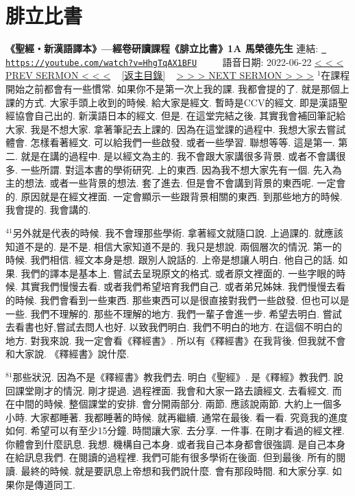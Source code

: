 \documentclass{book}
\begin{document}
\section{腓立比書}
\label{sec:HhgTqAX1BFU}
\textbf{《聖經‧新漢語譯本》—經卷研讀課程《腓立比書》1A 馬榮德先生}
\newline
\newline
連結: \href{https://youtube.com/watch?v=HhgTqAX1BFU}{\texttt{ https://youtube.com/watch?v=HhgTqAX1BFU}} ~~~~ 語音日期: 2022-06-22 
\newline
\newline
\hyperref[sec:code]{\small{< < < PREV SERMON < < <}}
~
\hyperref[sec:index]{\small{[返主目錄]}}
~
\hyperref[sec:io2zo_oCeFk]{\small{> > > NEXT SERMON > > >}}
\newline
\newline
$^{1}$在課程開始之前都會有一些慣常.
如果你不是第一次上我的課.
我都會提的了.
就是那個上課的方式.
大家手頭上收到的時候.
給大家是經文.
暫時是CCV的經文.
即是漢語聖經協會自己出的.
新漢語日本的經文.
但是.
在這堂完結之後.
其實我會補回筆記給大家.
我是不想大家.
拿著筆記去上課的.
因為在這堂課的過程中.
我想大家去嘗試體會.
怎樣看著經文.
可以給我們一些啟發.
或者一些學習.
聯想等等.
這是第一.
第二.
就是在講的過程中.
是以經文為主的.
我不會跟大家講很多背景.
或者不會講很多.
一些所謂.
對這本書的學術研究.
上的東西.
因為我不想大家先有一個.
先入為主的想法.
或者一些背景的想法.
套了進去.
但是會不會講到背景的東西呢.
一定會的.
原因就是在經文裡面.
一定會顯示一些跟背景相關的東西.
到那些地方的時候.
我會提的.
我會講的.

$^{41}$另外就是代表的時候.
我不會理那些學術.
拿著經文就隨口說.
上過課的.
就應該知道不是的.
是不是.
相信大家知道不是的.
我只是想說.
兩個層次的情況.
第一的時候.
我們相信.
經文本身是想.
跟別人說話的.
上帝是想讓人明白.
他自己的話.
如果.
我們的譯本是基本上.
嘗試去呈現原文的格式.
或者原文裡面的.
一些字眼的時候.
其實我們慢慢去看.
或者我們希望培育我們自己.
或者弟兄姊妹.
我們慢慢去看的時候.
我們會看到一些東西.
那些東西可以是很直接對我們一些啟發.
但也可以是一些.
我們不理解的.
那些不理解的地方.
我們一輩子會進一步.
希望去明白.
嘗試去看書也好,嘗試去問人也好.
以致我們明白.
我們不明白的地方.
在這個不明白的地方.
對我來說.
我一定會看《釋經書》.
所以有《釋經書》在我背後.
但我就不會和大家說.
《釋經書》說什麼.

$^{81}$那些狀況.
因為不是《釋經書》教我們去.
明白《聖經》.
是《釋經》教我們.
說回課堂剛才的情況.
剛才提過.
過程裡面.
我會和大家一路去讀經文.
去看經文.
而在中間的時候.
整個課堂的安排.
會分開兩部分.
兩節.
應該說兩節.
大約上一個多小時.
大家都睡著.
我都睡著的時候.
就再繼續.
通常在最後.
看一看.
究竟我的進度如何.
希望可以有至少15分鐘.
時間讓大家.
去分享.
一件事.
在剛才看過的經文裡.
你體會到什麼訊息.
我想.
機構自己本身.
或者我自己本身都會很強調.
是自己本身在給訊息我們.
在閱讀的過程裡.
我們可能有很多學術在後面.
但到最後.
所有的閱讀.
最終的時候.
就是要訊息上帝想和我們說什麼.
會有那段時間.
和大家分享.
如果你是傳道同工.
\end{document}
